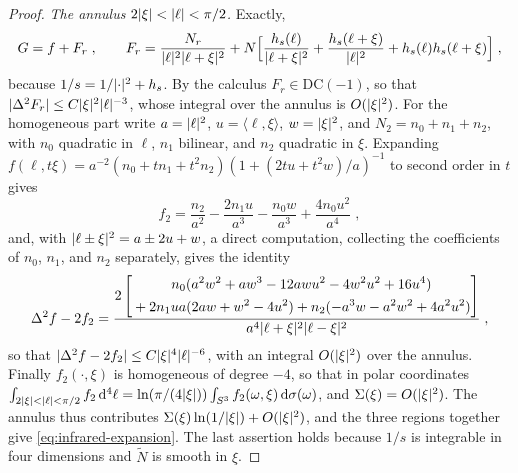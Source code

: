 \documentclass[11pt]{preprint}
\newcommand{\dd}{\mathrm{d}}
\DeclarePairedDelimiter{\abs}{\lvert}{\rvert}
\numberwithin{equation}{section}
\theoremstyle{definition}
\theoremstyle{remark}
\theoremstyle{plain}
\begin{document}
\begin{proof}
\emph{The annulus $2\abs{\xi} < \abs{\ell} < \pi/2$.} Exactly,
\begin{equation}\label{eq:annulus-split}
    G = f + F_r\;,
    \qquad
    F_r = \frac{N_r}{\abs{\ell}^2\abs{\ell + \xi}^2} + N\Bigl[\frac{h_s(\ell)}{\abs{\ell + \xi}^2} + \frac{h_s(\ell + \xi)}{\abs{\ell}^2} + h_s(\ell)h_s(\ell + \xi)\Bigr]\;,
\end{equation}
because $1/s = 1/\abs{\cdot}^2 + h_s$. By the calculus $F_r \in \mathrm{DC}(-1)$, so that $\abs{\Delta^2F_r} \leq C\abs{\xi}^2\abs{\ell}^{-3}$, whose integral over the annulus is $O(\abs{\xi}^2)$. For the homogeneous part write $a = \abs{\ell}^2$, $u = \langle\ell, \xi\rangle$, $w = \abs{\xi}^2$, and $N_2 = n_0 + n_1 + n_2$, with $n_0$ quadratic in $\ell$, $n_1$ bilinear, and $n_2$ quadratic in $\xi$. Expanding $f(\ell, t\xi) = a^{-2}(n_0 + tn_1 + t^2n_2)(1 + (2tu + t^2w)/a)^{-1}$ to second order in $t$ gives
\begin{equation}\label{eq:f-two}
    f_2 = \frac{n_2}{a^2} - \frac{2n_1u}{a^3} - \frac{n_0w}{a^3} + \frac{4n_0u^2}{a^4}\;,
\end{equation}
and, with $\abs{\ell \pm \xi}^2 = a \pm 2u + w$, a direct computation, collecting the coefficients of $n_0$, $n_1$, and $n_2$ separately, gives the identity
\begin{equation}\label{eq:second-difference-identity}
    \Delta^2f - 2f_2 = \frac{2\left[\begin{gathered}
        n_0(a^2w^2 + aw^3 - 12awu^2 - 4w^2u^2 + 16u^4)\\
        {}+ 2n_1ua(2aw + w^2 - 4u^2) + n_2(-a^3w - a^2w^2 + 4a^2u^2)
    \end{gathered}\right]}{a^4\abs{\ell + \xi}^2\abs{\ell - \xi}^2}\;,
\end{equation}
so that $\abs{\Delta^2f - 2f_2} \leq C\abs{\xi}^4\abs{\ell}^{-6}$, with an integral $O(\abs{\xi}^2)$ over the annulus. Finally $f_2(\cdot, \xi)$ is homogeneous of degree $-4$, so that in polar coordinates $\int_{2\abs{\xi}<\abs{\ell}<\pi/2}f_2\,\dd^4\ell = \ln(\pi/(4\abs{\xi}))\int_{S^3}f_2(\omega, \xi)\,\dd\sigma(\omega)$, and $\Sigma(\xi) = O(\abs{\xi}^2)$. The annulus thus contributes $\Sigma(\xi)\ln(1/\abs{\xi}) + O(\abs{\xi}^2)$, and the three regions together give \eqref{eq:infrared-expansion}. The last assertion holds because $1/s$ is integrable in four dimensions and $\tilde N$ is smooth in $\xi$.
\end{proof}
\end{document}
